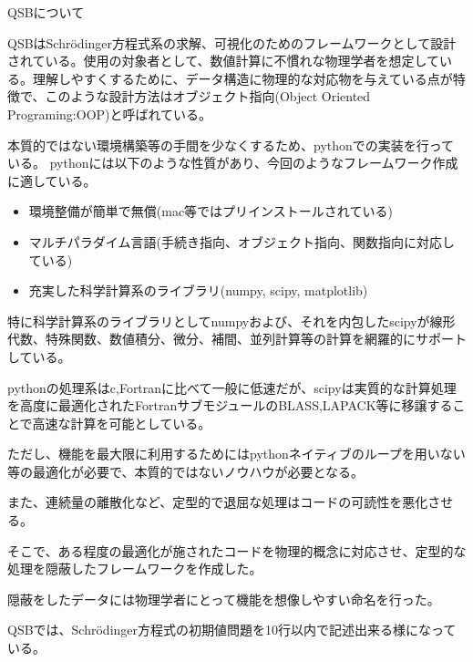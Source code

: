 \documentclass[a4paper, lualatex]{bxjsarticle}
\begin{document}
    \begin{subsection}{QSBについて}
        \par QSBはSchrödinger方程式系の求解、可視化のためのフレームワークとして設計されている。使用の対象者として、数値計算に不慣れな物理学者を想定している。理解しやすくするために、データ構造に物理的な対応物を与えている点が特徴で、このような設計方法はオブジェクト指向(Object Oriented Programing:OOP)と呼ばれている。
        \par 本質的ではない環境構築等の手間を少なくするため、pythonでの実装を行っている。
        pythonには以下のような性質があり、今回のようなフレームワーク作成に適している。
        \begin{itemize}
            \item 環境整備が簡単で無償(mac等ではプリインストールされている)
            \item マルチパラダイム言語(手続き指向、オブジェクト指向、関数指向に対応している)
            \item 充実した科学計算系のライブラリ(numpy, scipy, matplotlib)
        \end{itemize}
        \par 特に科学計算系のライブラリとしてnumpyおよび、それを内包したscipyが線形代数、特殊関数、数値積分、微分、補間、並列計算等の計算を網羅的にサポートしている。
        \par pythonの処理系はc,Fortranに比べて一般に低速だが、scipyは実質的な計算処理を高度に最適化されたFortranサブモジュールのBLASS,LAPACK等に移譲することで高速な計算を可能としている。
        \par ただし、機能を最大限に利用するためにはpythonネイティブのループを用いない等の最適化が必要で、本質的ではないノウハウが必要となる。
        \par また、連続量の離散化など、定型的で退屈な処理はコードの可読性を悪化させる。
        \par そこで、ある程度の最適化が施されたコードを物理的概念に対応させ、定型的な処理を隠蔽したフレームワークを作成した。
        \par 隠蔽をしたデータには物理学者にとって機能を想像しやすい命名を行った。
        \par QSBでは、Schrödinger方程式の初期値問題を10行以内で記述出来る様になっている。
    \end{subsection}
\newpage
\end{document}
